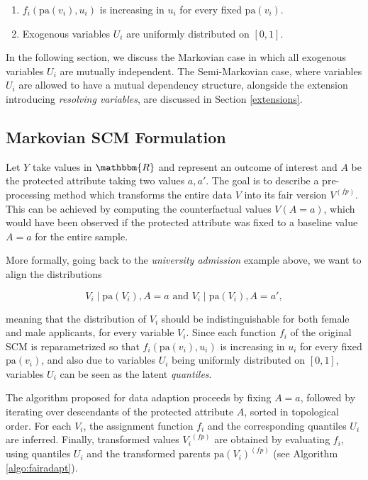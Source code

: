 \documentclass[
  nojss]{jss}
\providecommand{\tightlist}{%
  \setlength{\itemsep}{0pt}\setlength{\parskip}{0pt}}
\begin{document}
\begin{enumerate}
\def\labelenumi{(\roman{enumi})}
\tightlist
\item
  \(f_i(\mathrm{pa}(v_i), u_i)\) is increasing in \(u_i\) for every
  fixed \(\mathrm{pa}(v_i)\).
\item
  Exogenous variables \(U_i\) are uniformly distributed on \([0, 1]\).
\end{enumerate}

In the following section, we discuss the Markovian case in which all
exogenous variables \(U_i\) are mutually independent. The Semi-Markovian
case, where variables \(U_i\) are allowed to have a mutual dependency
structure, alongside the extension introducing \emph{resolving
variables}, are discussed in Section \ref{extensions}.

\hypertarget{markovian-scm-formulation}{%
\subsection{Markovian SCM Formulation}\label{markovian-scm-formulation}}

Let \(Y\) take values in \(\mathbbm{R}\) and represent an outcome of
interest and \(A\) be the protected attribute taking two values
\(a, a'\). The goal is to describe a pre-processing method which
transforms the entire data \(V\) into its fair version \( {V}^{(fp)}\).
This can be achieved by computing the counterfactual values
\(V(A = a)\), which would have been observed if the protected attribute
was fixed to a baseline value \(A = a\) for the entire sample.

More formally, going back to the \emph{university admission} example
above, we want to align the distributions

\[V_i \mid \mathrm{pa}(V_i), A = a \text{ and } V_i \mid \mathrm{pa}(V_i), A = a',\]

meaning that the distribution of \(V_i\) should be indistinguishable for
both female and male applicants, for every variable \(V_i\). Since each
function \(f_i\) of the original SCM is reparametrized so that
\(f_i(\mathrm{pa}(v_i), u_i)\) is increasing in \(u_i\) for every fixed
\(\mathrm{pa}(v_i)\), and also due to variables \(U_i\) being uniformly
distributed on \([0, 1]\), variables \(U_i\) can be seen as the latent
\emph{quantiles}.

The algorithm proposed for data adaption proceeds by fixing \(A = a\),
followed by iterating over descendants of the protected attribute \(A\),
sorted in topological order. For each \(V_i\), the assignment function
\(f_i\) and the corresponding quantiles \(U_i\) are inferred. Finally,
transformed values \( {V_i}^{(fp)}\) are obtained by evaluating \(f_i\),
using quantiles \(U_i\) and the transformed parents
\( {\mathrm{pa}(V_i)}^{(fp)}\) (see Algorithm \ref{algo:fairadapt}).
\end{document}
